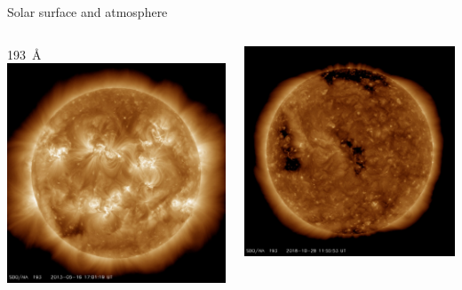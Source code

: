 \begin{frame}[plain,c]{Solar surface and atmosphere}{}
\begin{columns}[c]
	
		\centering \small \SI{193}{\AA} \color{white}{g}
		\includegraphics[width=\textwidth]{../talk_figures/20130516_170119_1024_0193.jpg}
		
		\includegraphics[width=\textwidth]{../talk_figures/20181028_115553_1024_0193.jpg}
		
	\end{columns}
\end{frame}

